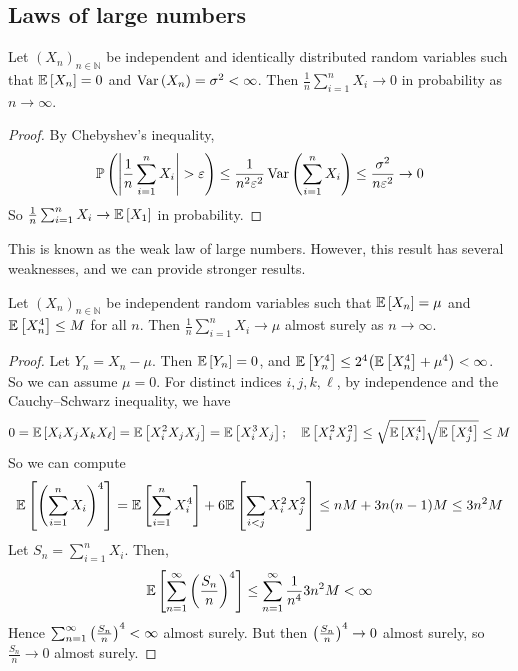 \subsection{Laws of large numbers}
\begin{proposition}
	Let \( (X_n)_{n \in \mathbb N} \) be independent and identically distributed random variables such that \( \mathbb{E}\left[{X_n}\right] = 0 \) and \( \operatorname{Var}\left({X_n}\right) = \sigma^2 < \infty \).
	Then \( \frac{1}{n} \sum_{i=1}^n X_i \to 0 \) in probability as \( n \to \infty \).
\end{proposition}
\begin{proof}
	By Chebyshev's inequality,
	\[ \mathbb{P}\left({\abs{\frac{1}{n}\sum_{i=1}^n X_i} > \varepsilon}\right) \leq \frac{1}{n^2 \varepsilon^2} \operatorname{Var}\left({\sum_{i=1}^n X_i}\right) \leq \frac{\sigma^2}{n\varepsilon^2} \to 0 \]
	So \( \frac{1}{n} \sum_{i=1}^n X_i \to \mathbb{E}\left[{X_1}\right] \) in probability.
\end{proof}
This is known as the weak law of large numbers.
However, this result has several weaknesses, and we can provide stronger results.
\begin{proposition}
	Let \( (X_n)_{n \in \mathbb N} \) be independent random variables such that \( \mathbb{E}\left[{X_n}\right] = \mu \) and \( \mathbb{E}\left[{X_n^4}\right] \leq M \) for all \( n \).
	Then \( \frac{1}{n} \sum_{i=1}^n X_i \to \mu \) almost surely as \( n \to \infty \).
\end{proposition}
\begin{proof}
	Let \( Y_n = X_n - \mu \).
	Then \( \mathbb{E}\left[{Y_n}\right] = 0 \), and \( \mathbb{E}\left[{Y_n^4}\right] \leq 2^4 \qty(\mathbb{E}\left[{X_n^4}\right] + \mu^4) < \infty \).
	So we can assume \( \mu = 0 \).
	For distinct indices \( i, j, k, \ell \), by independence and the Cauchy--Schwarz inequality, we have
	\[ 0 = \mathbb{E}\left[{X_i X_j X_k X_\ell}\right] = \mathbb{E}\left[{X_i^2 X_j X_j}\right] = \mathbb{E}\left[{X_i^3 X_j}\right];\quad \mathbb{E}\left[{X_i^2 X_j^2}\right] \leq \sqrt{\mathbb{E}\left[{X_i^4}\right]}\sqrt{\mathbb{E}\left[{X_j^4}\right]} \leq M \]
	So we can compute
	\[ \mathbb{E}\left[{\qty(\sum_{i=1}^n X_i)^4}\right] = \mathbb{E}\left[{\sum_{i=1}^n X_i^4}\right] + 6\mathbb{E}\left[{\sum_{i < j} X_i^2 X_j^2}\right] \leq nM + 3n(n-1)M \leq 3n^2 M \]
	Let \( S_n = \sum_{i=1}^n X_i \).
	Then,
	\[ \mathbb{E}\left[{\sum_{n=1}^\infty \qty(\frac{S_n}{n})^4}\right] \leq \sum_{n=1}^\infty \frac{1}{n^4} 3n^2 M < \infty \]
	Hence \( \sum_{n=1}^\infty \qty(\frac{S_n}{n})^4 < \infty \) almost surely.
	But then \( \qty(\frac{S_n}{n})^4 \to 0 \) almost surely, so \( \frac{S_n}{n} \to 0 \) almost surely.
\end{proof}


